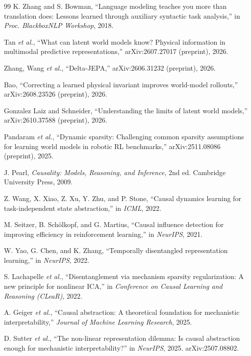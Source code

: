 \documentclass[11pt, a4paper, oneside,enumerate,textcomp]{report}
\begin{document}
\begin{thebibliography}{99}
K. Zhang and S. Bowman, ``Language modeling teaches you more than translation does: Lessons learned through auxiliary syntactic task analysis,'' in \emph{Proc. BlackboxNLP Workshop}, 2018.

Tan \emph{et al.}, ``What can latent world models know? Physical information in multimodal predictive representations,'' arXiv:2607.27017 (preprint), 2026.

Zhang, Wang \emph{et al.}, ``Delta-JEPA,'' arXiv:2606.31232 (preprint), 2026.

Bao, ``Correcting a learned physical invariant improves world-model rollouts,'' arXiv:2608.23526 (preprint), 2026.

Gonzalez Laiz and Schneider, ``Understanding the limits of latent world models,'' arXiv:2610.37588 (preprint), 2026.

Pandaram \emph{et al.}, ``Dynamic sparsity: Challenging common sparsity assumptions for learning world models in robotic RL benchmarks,'' arXiv:2511.08086 (preprint), 2025.

J. Pearl, \emph{Causality: Models, Reasoning, and Inference}, 2nd ed. Cambridge University Press, 2009.

Z. Wang, X. Xiao, Z. Xu, Y. Zhu, and P. Stone, ``Causal dynamics learning for task-independent state abstraction,'' in \emph{ICML}, 2022.

M. Seitzer, B. Sch\"olkopf, and G. Martius, ``Causal influence detection for improving efficiency in reinforcement learning,'' in \emph{NeurIPS}, 2021.

W. Yao, G. Chen, and K. Zhang, ``Temporally disentangled representation learning,'' in \emph{NeurIPS}, 2022.

S. Lachapelle \emph{et al.}, ``Disentanglement via mechanism sparsity regularization: A new principle for nonlinear ICA,'' in \emph{Conference on Causal Learning and Reasoning (CLeaR)}, 2022.

A. Geiger \emph{et al.}, ``Causal abstraction: A theoretical foundation for mechanistic interpretability,'' \emph{Journal of Machine Learning Research}, 2025.

D. Sutter \emph{et al.}, ``The non-linear representation dilemma: Is causal abstraction enough for mechanistic interpretability?'' in \emph{NeurIPS}, 2025. arXiv:2507.08802.


\end{thebibliography}
\end{document}
